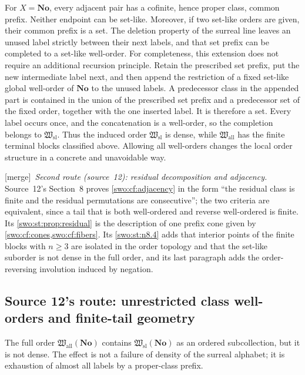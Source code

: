 \documentclass[11pt]{article}
\theoremstyle{definition}
\theoremstyle{remark}
\newcommand{\No}{\mathbf{No}}
\newcommand{\Hsl}{\mathfrak W_{\mathrm{sl}}}
\newcommand{\Hall}{\mathfrak W_{\mathrm{all}}}
\newcommand{\merge}{\textsf{[merge]}}
\begin{document}
For \(X=\No\), every adjacent pair has a cofinite, hence proper class,
common prefix.  Neither endpoint can be set-like.  Moreover, if two
set-like orders are given, their common prefix is a set.  The deletion
property of the surreal line leaves an unused label strictly between their
next labels, and that set prefix can be completed to a set-like well-order.
For completeness, this extension does not require an additional recursion
principle.  Retain the prescribed set prefix, put the new intermediate
label next, and then append the restriction of a fixed set-like global
well-order of \(\No\) to the unused labels.  A predecessor class in the
appended part is contained in the union of the prescribed set prefix and
a predecessor set of the fixed order, together with the one inserted
label.  It is therefore a set.  Every label occurs once, and the
concatenation is a well-order, so the completion belongs to \(\Hsl\).
Thus the induced order \(\Hsl\) is dense, while \(\Hall\) has the
finite terminal blocks classified above.  Allowing all well-orders changes
the local order structure in a concrete and unavoidable way.


\merge\ \emph{Second route (source~12): residual decomposition and
adjacency.} Source~12's Section~8 proves \cref{swo:cf:adjacency} in the form
``the residual class is finite and the residual permutations are consecutive'';
the two criteria are equivalent, since a tail that is both well-ordered and
reverse well-ordered is finite. Its \cref{swo:st:prop:residual} is the
description of one prefix cone given by \cref{swo:cf:cones,swo:cf:fibers}. Its
\cref{swo:st:n8.4} adds that interior points of the finite blocks with
$n\ge3$ are isolated in the order topology and that the set-like suborder is
not dense in the full order, and its last paragraph adds the order-reversing
involution induced by negation.

\subsection{Source 12's route: unrestricted class well-orders and finite-tail geometry}
\label{swo:st:sec:fullgeometry}

The full order $\Hall(\No)$ contains $\Hsl(\No)$ as an ordered
subcollection, but it is not dense. The effect is not a failure of density
of the surreal alphabet; it is exhaustion of almost all labels by a
proper-class prefix.
\end{document}
